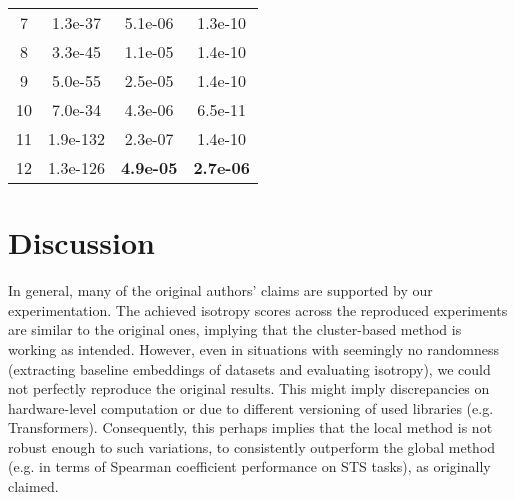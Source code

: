 \begin{table}[!htb]
\begin{subtable}{.5\linewidth}
\begin{tabular}{c|ccc}
            7     & 1.3e-37          & 5.1e-06          & 1.3e-10           \\
            8     & 3.3e-45          & 1.1e-05          & 1.4e-10           \\
            9     & 5.0e-55          & 2.5e-05          & 1.4e-10           \\
            10    & 7.0e-34          & 4.3e-06          & 6.5e-11           \\
            11    & 1.9e-132         & 2.3e-07          & 1.4e-10           \\
            12    & 1.3e-126         & \textbf{4.9e-05} & \textbf{2.7e-06}  \\
            \hline
        \end{tabular}
    \end{subtable} 
\end{table}



 

\section{Discussion}
\label{sec:disc}

In general, many of the original authors' claims are supported by our experimentation. The achieved isotropy scores across the reproduced experiments are similar to the original ones, implying that the cluster-based method is working as intended. However, even in situations with seemingly no randomness (extracting baseline embeddings of datasets and evaluating isotropy), we could not perfectly reproduce the original results. This might imply discrepancies on hardware-level computation or due to different versioning of used libraries (e.g. Transformers). Consequently, this perhaps implies that the local method is not robust enough to such variations, to consistently outperform the global method (e.g. in terms of Spearman coefficient performance on STS tasks), as originally claimed. 


